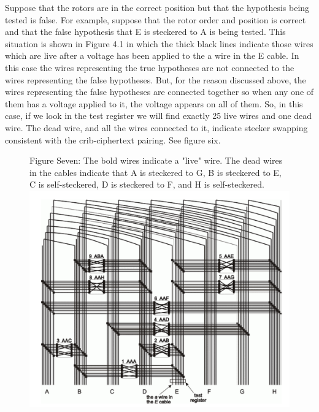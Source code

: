\documentclass[12pt,a4paper]{article}
\begin{document}
Suppose that the rotors are in the correct position but that the hypothesis being tested is false.
For example, suppose that the rotor order and position is correct and that the false hypothesis that E is steckered to A is being tested. This situation is shown in Figure 4.1 in which the thick black lines indicate those wires which are live after a voltage has been applied to the a wire in the E cable. In this case the wires representing the true hypotheses are not connected to the wires representing the false hypotheses. But, for the reason discussed above, the wires representing the false hypotheses are connected together so when any one of them has a voltage applied to it, the voltage appears on all of them. So, in this case, if we look in the test register we will find exactly 25 live wires and one dead wire. The dead wire, and all the wires connected to it, indicate stecker swapping consistent with the crib-ciphertext pairing. See figure six.

\begin{figure}[h]
\centering
Figure Seven: The bold wires indicate a "live" wire. The dead wires in the cables indicate that A is steckered to G, B is steckered to E, C is self-steckered, D is steckered to F, and H is self-steckered.
\includegraphics[width=\textwidth]{BOMBEfour.png}
\end{figure}
\end{document}
